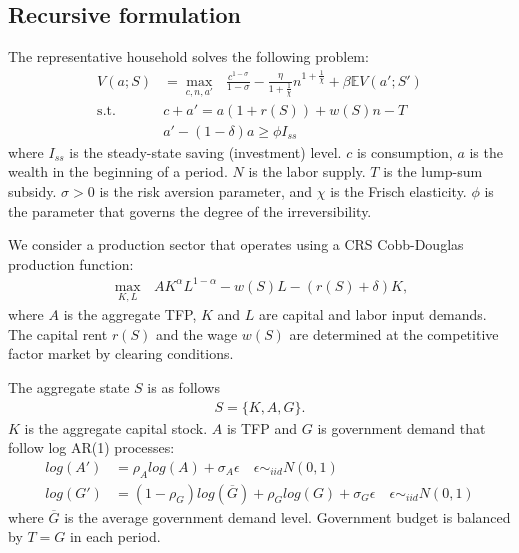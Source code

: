 \subsection*{Recursive formulation}
The representative household solves the following problem:
\begin{align*}
  V(a;S) &= \max_{c,n,a'}\text{ } \frac{c^{1-\sigma}}{1-\sigma} - \frac{\eta}{1+\frac{1}{\chi}} n^{1+\frac{1}{\chi}} + \beta \mathbb{E}V(a';S')
  \\
  \text{s.t. }& 
  c+a' = a(1+r(S)) + w(S)n - T
  \\
  &
  a' - (1-\delta)a \geq \phi I_{ss}
\end{align*}
where $I_{ss}$ is the steady-state saving (investment) level. $c$ is consumption, $a$ is the wealth in the beginning of a period. $N$ is the labor supply. $T$ is the lump-sum subsidy.
$\sigma>0$ is the risk aversion parameter, and $\chi$ is the Frisch elasticity.
$\phi$ is the parameter that governs the degree of the irreversibility. 

We consider a production sector that operates using a CRS Cobb-Douglas production function:
\begin{align*}
  \max_{K,L}\text{ } AK^{\alpha}L^{1-\alpha} - w(S)L - (r(S)+\delta)K,
\end{align*}
where $A$ is the aggregate TFP, $K$ and $L$ are capital and labor input demands. The capital rent $r(S)$ and the wage $w(S)$ are determined at the competitive factor market by clearing conditions.

The aggregate state $S$ is as follows
\begin{align*}
  S = \{K,A,G\}.
\end{align*}
$K$ is the aggregate capital stock. $A$ is TFP and $G$ is government demand that follow log AR(1) processes:
\begin{align*}
  log(A') &= \rho_{A}log(A) + \sigma_{A}\epsilon\quad \epsilon\sim_{iid} N(0,1)
  \\
  log(G') &= (1-\rho_{G})log(\overline{G})+\rho_{G}log(G) + \sigma_{G}\epsilon\quad \epsilon\sim_{iid} N(0,1)
\end{align*}
where $\overline{G}$ is the average government demand level.
Government budget is balanced by $T=G$ in each period.
